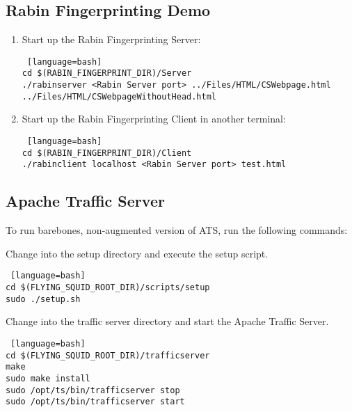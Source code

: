 \subsection{Rabin Fingerprinting Demo}

\begin{enumerate}

\item 

Start up the Rabin Fingerprinting Server:

\begin{lstlisting} [language=bash] 
cd $(RABIN_FINGERPRINT_DIR)/Server
./rabinserver <Rabin Server port> ../Files/HTML/CSWebpage.html ../Files/HTML/CSWebpageWithoutHead.html
\end{lstlisting}

\item Start up the Rabin Fingerprinting Client in another terminal:

\begin{lstlisting} [language=bash] 
cd $(RABIN_FINGERPRINT_DIR)/Client
./rabinclient localhost <Rabin Server port> test.html
\end{lstlisting}

\end{enumerate}

\subsection{Apache Traffic Server}

To run barebones, non-augmented version of ATS, run the following commands:


\item Change into the setup directory and execute the setup script.

\begin{lstlisting} [language=bash] 
cd $(FLYING_SQUID_ROOT_DIR)/scripts/setup
sudo ./setup.sh
\end{lstlisting}

\item 

Change into the traffic server directory and start the Apache Traffic Server.

\begin{lstlisting} [language=bash] 
cd $(FLYING_SQUID_ROOT_DIR)/trafficserver
make
sudo make install
sudo /opt/ts/bin/trafficserver stop
sudo /opt/ts/bin/trafficserver start
\end{lstlisting}

